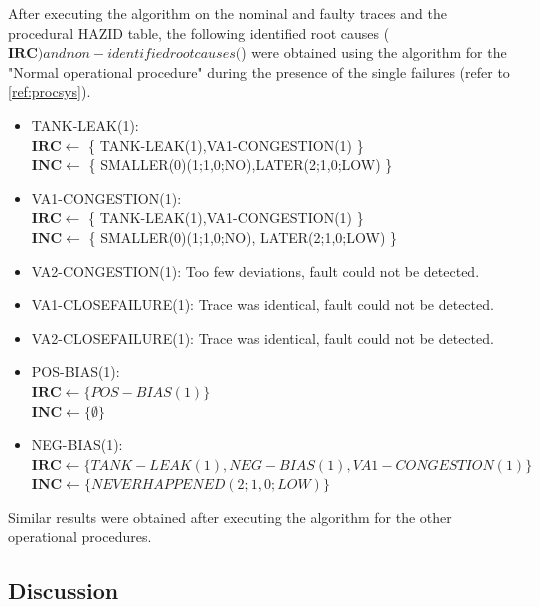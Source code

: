 \documentclass[conference]{IEEEtran}
\begin{document}
After executing the algorithm on the nominal and faulty traces and the procedural HAZID table, the following identified root causes ($\mathbf{IRC}) and non-identified root causes ($) were obtained using the algorithm for the "Normal operational procedure" during the presence of the single failures (refer to \ref{ref:procsys}).

\begin{itemize}

\item TANK-LEAK(1): \\ $\mathbf{IRC} \leftarrow$ \{ TANK-LEAK(1),VA1-CONGESTION(1) \} \\ $\mathbf{INC} \leftarrow$ \{ SMALLER(0)(1;1,0;NO),LATER(2;1,0;LOW) \}

\item VA1-CONGESTION(1): \\ $\mathbf{IRC} \leftarrow $ \{ TANK-LEAK(1),VA1-CONGESTION(1) \}\\ $\mathbf{INC} \leftarrow$ \{ SMALLER(0)(1;1,0;NO), LATER(2;1,0;LOW) \}

\item VA2-CONGESTION(1): Too few deviations, fault could not be detected.

\item VA1-CLOSEFAILURE(1): Trace was identical, fault could not be detected.

\item VA2-CLOSEFAILURE(1): Trace was identical, fault could not be detected.

\item POS-BIAS(1): \\ $\mathbf{IRC} \leftarrow \{ POS-BIAS(1) \}$ \\ $\mathbf{INC} \leftarrow \{ \emptyset \} $

\item NEG-BIAS(1): \\ $\mathbf{IRC} \leftarrow \{ TANK-LEAK(1), NEG-BIAS(1), VA1-CONGESTION(1) \}$ \\ $\mathbf{INC} \leftarrow \{ NEVERHAPPENED(2;1,0;LOW) \}$

\end{itemize}

Similar results were obtained after executing the algorithm for the other operational procedures.

\subsection{Discussion}
\end{document}
